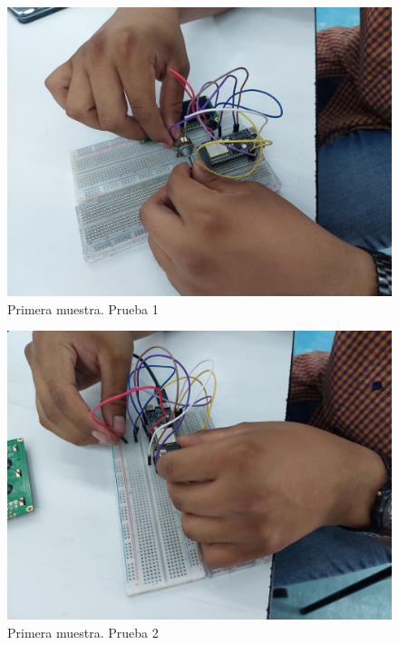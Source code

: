 \begin{figure}[H]
        \centering
        \includegraphics[trim = {30mm 30mm 30mm 30mm},clip,scale=0.2]{10/Img/muestra1Prueba1.jpg}
        \caption{Primera muestra. Prueba 1}
        \label{Prueba 1}
    \end{figure}

\begin{figure}[H]
        \centering
        \includegraphics[trim = {30mm 30mm 30mm 30mm},clip,scale=0.2]{10/Img/muestra1Prueba2.jpg}
        \caption{Primera muestra. Prueba 2}
        \label{Prueba 2}
    \end{figure}


